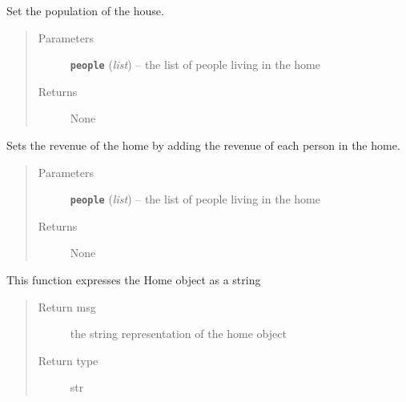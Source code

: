 \documentclass[letterpaper,10pt,english]{sphinxmanual}
\begin{document}
\begin{fulllineitems}
\begin{fulllineitems}
\begin{quote}
\begin{description}
\end{description}\end{quote}

\end{fulllineitems}


\begin{fulllineitems}
\label{home:home.Home.set_population}
Set the population of the house.
\begin{quote}\begin{description}
\item[{Parameters}] \leavevmode
\textbf{\texttt{people}} (\emph{list}) -- the list of people living in the home

\item[{Returns}] \leavevmode
None

\end{description}\end{quote}

\end{fulllineitems}


\begin{fulllineitems}
\label{home:home.Home.set_revenue}
Sets the revenue of the home by adding the revenue of each person in the home.
\begin{quote}\begin{description}
\item[{Parameters}] \leavevmode
\textbf{\texttt{people}} (\emph{list}) -- the list of people living in the home

\item[{Returns}] \leavevmode
None

\end{description}\end{quote}

\end{fulllineitems}


\begin{fulllineitems}
\label{home:home.Home.toString}
This function expresses the Home object as a string
\begin{quote}\begin{description}
\item[{Return msg}] \leavevmode
the string representation of the home object

\item[{Return type}] \leavevmode
str

\end{description}\end{quote}

\end{fulllineitems}


\end{fulllineitems}
\end{document}
